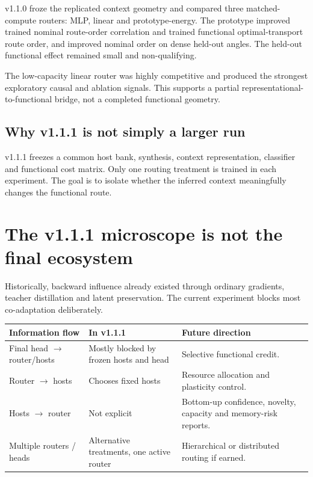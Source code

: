 \documentclass[11pt,a4paper]{article}
\newcommand{\tablehead}[1]{\cellcolor{DeepTeal}\color{white}\bfseries #1}
\begin{document}
v1.1.0 froze the replicated context geometry and compared three matched-compute routers: MLP, linear and prototype-energy. The prototype improved trained nominal route-order correlation and trained functional optimal-transport route order, and improved nominal order on dense held-out angles. The held-out functional effect remained small and non-qualifying.

The low-capacity linear router was highly competitive and produced the strongest exploratory causal and ablation signals. This supports a partial representational-to-functional bridge, not a completed functional geometry.

\subsection{Why v1.1.1 is not simply a larger run}

v1.1.1 freezes a common host bank, synthesis, context representation, classifier and functional cost matrix. Only one routing treatment is trained in each experiment. The goal is to isolate whether the inferred context meaningfully changes the functional route.

\newpage
\section{The v1.1.1 microscope is not the final ecosystem}

Historically, backward influence already existed through ordinary gradients, teacher distillation and latent preservation. The current experiment blocks most co-adaptation deliberately.

\begin{tabularx}{\textwidth}{p{4.1cm}p{3cm}X}
\toprule
\tablehead{Information flow} & \tablehead{In v1.1.1} & \tablehead{Future direction}\\
\midrule
Final head $\rightarrow$ router/hosts & Mostly blocked by frozen hosts and head & Selective functional credit.\\
Router $\rightarrow$ hosts & Chooses fixed hosts & Resource allocation and plasticity control.\\
Hosts $\rightarrow$ router & Not explicit & Bottom-up confidence, novelty, capacity and memory-risk reports.\\
Multiple routers / heads & Alternative treatments, one active router & Hierarchical or distributed routing if earned.\\
\bottomrule
\end{tabularx}
\end{document}
